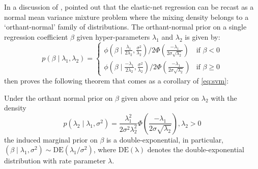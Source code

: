 \documentclass[lineno]{biometrika}
\begin{document}
In a discussion of \citet{polson2011data}, \citet{hans2011comment} pointed out that the elastic-net regression can be recast as a normal mean variance mixture problem where the mixing density belongs to a `orthant-normal' family of distributions. The orthant-normal prior on a single regression coefficient $\beta$ given hyper-parameters $\lambda_1$ and $\lambda_2$ is given by: 
\[
p (\beta \mid \lambda_1, \lambda_2)  = 
  \begin{cases} 
   \phi(\beta \mid \frac{\lambda_1}{2\lambda_2}, \frac{\sigma^2}{\lambda_2}) / 2\Phi(\frac{-\lambda_1}{2\sigma\sqrt{\lambda_2}}) & \text{if } \beta < 0 \\
   \phi(\beta \mid \frac{-\lambda_1}{2\lambda_2}, \frac{\sigma^2}{\lambda_2}) / 2\Phi(\frac{-\lambda_1}{2\sigma\sqrt{\lambda_2}})       & \text{if } \beta \geq 0
  \end{cases} \label{eq:hans}
\]
\citet{hans2011comment} then proves the following theorem that comes as a corollary of \eqref{eq:svm}: 
\begin{theorem}
Under the orthant normal prior on $\beta$ given above and prior on $\lambda_2$ with the density
$$
p(\lambda_2 \mid \lambda_1, \sigma^2) = \frac{\lambda_1^2}{2\sigma^2\lambda_2^2} \Phi \left( \frac{-\lambda_1}{2\sigma \sqrt{\lambda_2}} \right), \lambda_2 > 0 
$$
the induced marginal prior on $\beta$ is a double-exponential, in particular, $(\beta \mid \lambda_1, \sigma^2) \sim \mathrm{DE}(\lambda_1/\sigma^2)$, where $\mathrm{DE(\lambda)}$ denotes the double-exponential distribution with rate parameter $\lambda$. 
\end{theorem}


\end{document}
